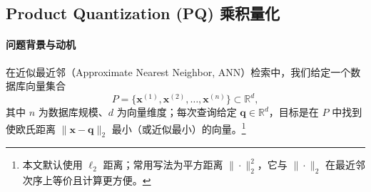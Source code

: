 \documentclass[lang=cn,newtx,10pt,scheme=chinese,chinesefont=nofont,citestyle=gb7714-2015, bibstyle=gb7714-2015]{elegantbook}
\begin{document}
\begin{refsection}






\section[Product Quantization (PQ) 乘积量化]{Product Quantization (PQ) 乘积量化}

\paragraph{问题背景与动机}
在近似最近邻（Approximate Nearest Neighbor, ANN）检索中，我们给定一个数据库向量集合
\[
P=\{\mathbf{x}^{(1)},\mathbf{x}^{(2)},\ldots,\mathbf{x}^{(n)}\}\subset \mathbb{R}^d,
\]
其中 $n$ 为数据库规模、$d$ 为向量维度；每次查询给定 $\mathbf{q}\in\mathbb{R}^d$，目标是在 $P$ 中找到使欧氏距离
$\|\mathbf{x}-\mathbf{q}\|_2$ 最小（或近似最小）的向量。\footnote{本文默认使用 $\ell_2$ 距离；常用写法为平方距离 $\|\cdot\|_2^2$，它与 $\|\cdot\|_2$ 在最近邻次序上等价且计算更方便。}


\end{refsection}
\end{document}
